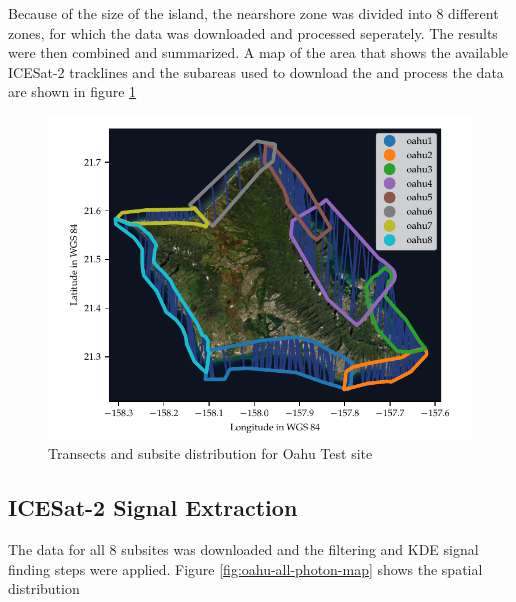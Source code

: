 Because of the size of the island, the nearshore zone was divided into 8 different zones, for which the data was downloaded and processed seperately. The results were then combined and summarized. A map of the area that shows the available ICESat-2 tracklines and the subareas used to download the and process the data are shown in figure \ref{fig:oahu-all-sites-transects}

\begin{figure}[h]
    \centering
    \includegraphics[width=\textwidth]{figures/Oahu_all_tracklines.pdf}
    \caption{Transects and subsite distribution for Oahu Test site}
    \label{fig:oahu-all-sites-transects}
\end{figure}

\subsection{ICESat-2 Signal Extraction}

The data for all 8 subsites was downloaded and the filtering and KDE signal finding steps were applied. Figure \ref{fig:oahu-all-photon-map} shows the spatial distribution

